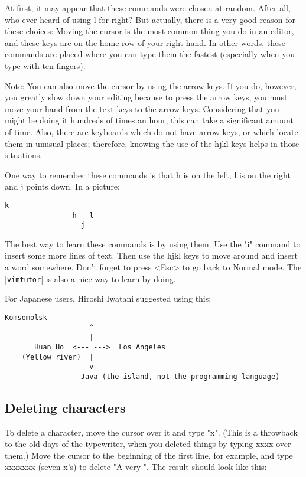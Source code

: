 At first, it may appear that these commands were chosen at random.
After all, who ever heard of using l for right?  But actually, there is a very good reason for these choices: Moving the cursor is the most common thing you do in an editor, and these keys are on the home row of your right hand.
In other words, these commands are placed where you can type them the fastest (especially when you type with ten fingers).

Note:
You can also move the cursor by using the arrow keys.
If you do, however, you greatly slow down your editing because to press the arrow keys, you must move your hand from the text keys to the arrow keys.
Considering that you might be doing it hundreds of times an hour, this can take a significant amount of time.
Also, there are keyboards which do not have arrow keys, or which locate them in unusual places; therefore, knowing the use of the hjkl keys helps in those situations.

One way to remember these commands is that h is on the left, l is on the right and j points down.
In a picture: 

\begin{Verbatim}[samepage=true]
				  k
				h   l
				  j
\end{Verbatim}

The best way to learn these commands is by using them.
Use the "i" command to insert some more lines of text.
Then use the hjkl keys to move around and insert a word somewhere.
Don't forget to press <Esc> to go back to Normal mode.
The \hyperref[vimtutor]{|\texttt{vimtutor}|} is also a nice way to learn by doing.

For Japanese users, Hiroshi Iwatani suggested using this:

\begin{Verbatim}[samepage=true]
                Komsomolsk
                    ^
                    |
       Huan Ho  <--- --->  Los Angeles
    (Yellow river)  |
                    v
                  Java (the island, not the programming language)
\end{Verbatim}

\subsection{Deleting characters}

To delete a character, move the cursor over it and type "x".
(This is a throwback to the old days of the typewriter, when you deleted things by typing xxxx over them.)
Move the cursor to the beginning of the first line, for example, and type xxxxxxx (seven x's) to delete "A very ".
The result should look like this: 

